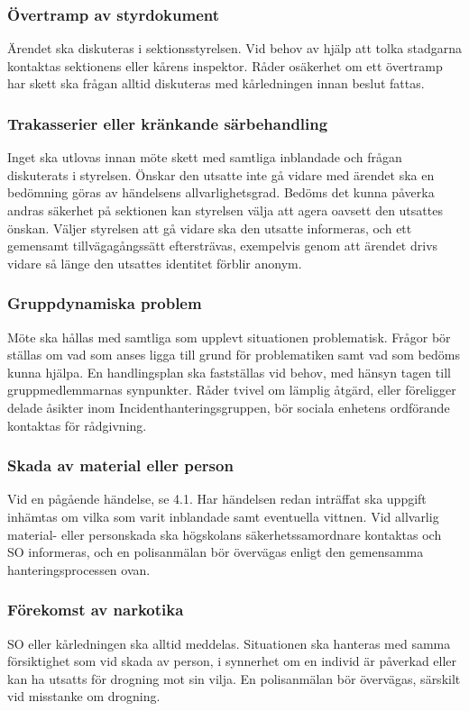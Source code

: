 \subsubsection*{Övertramp av styrdokument}
Ärendet ska diskuteras i sektionsstyrelsen. Vid behov av hjälp att tolka stadgarna kontaktas sektionens eller kårens inspektor. Råder osäkerhet om ett övertramp har skett ska frågan alltid diskuteras med kårledningen innan beslut fattas.

\subsubsection*{Trakasserier eller kränkande särbehandling}
Inget ska utlovas innan möte skett med samtliga inblandade och frågan diskuterats i styrelsen. Önskar den utsatte inte gå vidare med ärendet ska en bedömning göras av händelsens allvarlighetsgrad. Bedöms det kunna påverka andras säkerhet på sektionen kan styrelsen välja att agera oavsett den utsattes önskan. Väljer styrelsen att gå vidare ska den utsatte informeras, och ett gemensamt tillvägagångssätt eftersträvas, exempelvis genom att ärendet drivs vidare så länge den utsattes identitet förblir anonym.

\subsubsection*{Gruppdynamiska problem}
Möte ska hållas med samtliga som upplevt situationen problematisk. Frågor bör ställas om vad som anses ligga till grund för problematiken samt vad som bedöms kunna hjälpa. En handlingsplan ska fastställas vid behov, med hänsyn tagen till gruppmedlemmarnas synpunkter. Råder tvivel om lämplig åtgärd, eller föreligger delade åsikter inom Incidenthanteringsgruppen, bör sociala enhetens ordförande kontaktas för rådgivning.

\subsubsection*{Skada av material eller person}
Vid en pågående händelse, se 4.1. Har händelsen redan inträffat ska uppgift inhämtas om vilka som varit inblandade samt eventuella vittnen. Vid allvarlig material- eller personskada ska högskolans säkerhetssamordnare kontaktas och SO informeras, och en polisanmälan bör övervägas enligt den gemensamma hanteringsprocessen ovan.

\subsubsection*{Förekomst av narkotika}
SO eller kårledningen ska alltid meddelas. Situationen ska hanteras med samma försiktighet som vid skada av person, i synnerhet om en individ är påverkad eller kan ha utsatts för drogning mot sin vilja. En polisanmälan bör övervägas, särskilt vid misstanke om drogning.

